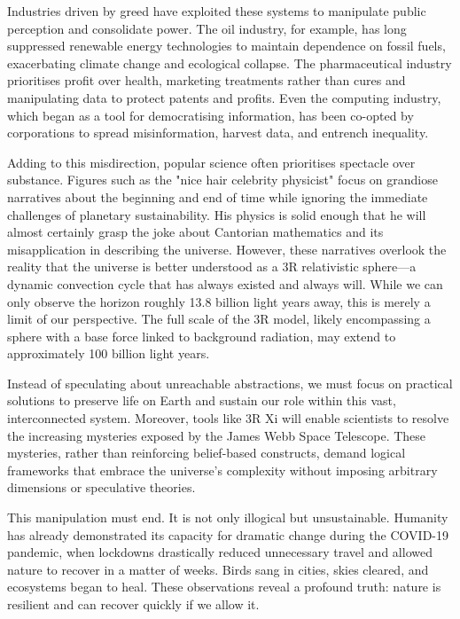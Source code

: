 \documentclass[12pt]{article}
\begin{document}
Industries driven by greed have exploited these systems to manipulate public perception and consolidate power. The oil industry, for example, has long suppressed renewable energy technologies to maintain dependence on fossil fuels, exacerbating climate change and ecological collapse. The pharmaceutical industry prioritises profit over health, marketing treatments rather than cures and manipulating data to protect patents and profits. Even the computing industry, which began as a tool for democratising information, has been co-opted by corporations to spread misinformation, harvest data, and entrench inequality.

Adding to this misdirection, popular science often prioritises spectacle over substance. Figures such as the "nice hair celebrity physicist" focus on grandiose narratives about the beginning and end of time while ignoring the immediate challenges of planetary sustainability. His physics is solid enough that he will almost certainly grasp the joke about Cantorian mathematics and its misapplication in describing the universe. However, these narratives overlook the reality that the universe is better understood as a 3R relativistic sphere—a dynamic convection cycle that has always existed and always will. While we can only observe the horizon roughly 13.8 billion light years away, this is merely a limit of our perspective. The full scale of the 3R model, likely encompassing a sphere with a base force linked to background radiation, may extend to approximately 100 billion light years. 

Instead of speculating about unreachable abstractions, we must focus on practical solutions to preserve life on Earth and sustain our role within this vast, interconnected system. Moreover, tools like 3R Xi will enable scientists to resolve the increasing mysteries exposed by the James Webb Space Telescope. These mysteries, rather than reinforcing belief-based constructs, demand logical frameworks that embrace the universe's complexity without imposing arbitrary dimensions or speculative theories.

This manipulation must end. It is not only illogical but unsustainable. Humanity has already demonstrated its capacity for dramatic change during the COVID-19 pandemic, when lockdowns drastically reduced unnecessary travel and allowed nature to recover in a matter of weeks. Birds sang in cities, skies cleared, and ecosystems began to heal. These observations reveal a profound truth: nature is resilient and can recover quickly if we allow it.
\end{document}
